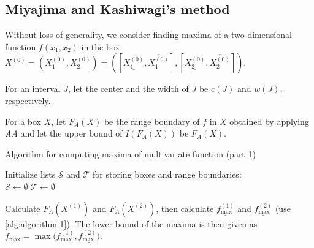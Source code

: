 \documentclass[fontsize=11pt,a4paper]{scrartcl} %
\begin{document}
\subsection{Miyajima and Kashiwagi's method}

Without loss of generality, we consider finding maxima of a two-dimensional function $f(x_1, x_2)$ in the box $X^{(0)} = (X_1^{(0)}, X_2^{(0)}) = ([\underline{X_1^{(0)}}, \overline{X_1^{(0)}}], [\underline{X_2^{(0)}}, \overline{X_2^{(0)}}])$.

For an interval $J$, let the center and the width of $J$ be $c(J)$ and $w(J)$, respectively.

For a box $X$, let $F_A(X)$ be the range boundary of $f$ in $X$ obtained by applying \emph{AA} and let the upper bound of $I(F_A(X))$ be $\overline{F_A(X)}$.

\begin{algorithm}
    \caption{Algorithm for computing maxima of multivariate function (part 1)}\label{alg:minima-maxima-p1}
    
    Initialize lists $\mathcal{S}$ and $\mathcal{T}$ for storing boxes and range boundaries:\\
    $\mathcal{S} \gets \emptyset$\;
    $\mathcal{T} \gets \emptyset$\;
    

    Calculate $F_A(X^{(1)})$ and $F_A(X^{(2)})$, then calculate $\underline{f_{\max}^{(1)}}$ and $\underline{f_{\max}^{(2)}}$ (use \cref{alg:algorithm-1}). The lower bound of the maxima is then given as $\underline{f_{\max}} = \max(\underline{f^{(1)}_{\max}}, \underline{f^{(2)}_{\max})}$.
    
\end{algorithm}
\end{document}

